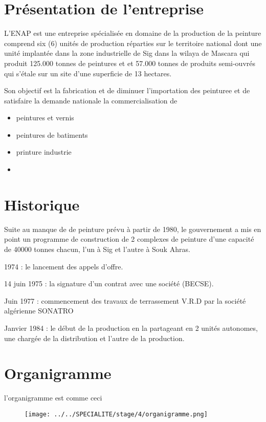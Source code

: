 \documentclass[20pt,a4paper]{report}
\begin{document}
		\begin{large}
		\section{Présentation de l’entreprise}

L’ENAP est une entreprise spécialisée en domaine de la production de la peinture comprend six (6) unités de production réparties sur le territoire national dont une unité implantée dans la zone industrielle de Sig dans la wilaya de Mascara qui produit 125.000 tonnes de peintures et et  57.000 tonnes de produits semi-ouvrés qui s’étale sur un site d’une superficie de  13 hectares.

Son objectif est la fabrication et  de diminuer l’importation des peinturee et de satisfaire la demande nationale la commercialisation de 
		\begin{itemize}
		\item peintures et vernis
		\item peintures de batiments
		\item printure industrie
		\item
		\end{itemize}




		\section{Historique}

Suite au manque de   de peinture prévu à partir de 1980, le gouvernement a mis en point un programme de construction de 2 complexes de peinture d’une capacité de 40000 tonnes chacun, l’un à Sig et l’autre à Souk Ahras.

1974 : le lancement des appels d’offre.

14 juin 1975 : la signature d’un contrat avec une société (BECSE).

Juin 1977 : commencement des travaux de terrassement V.R.D par la société algérienne SONATRO 

Janvier 1984 : le début de la production en la partageant en 2 unités autonomes, une chargée de la distribution et l’autre de la production.
		\section{Organigramme} 
 l'organigramme est comme ceci
		\end{large}
 			
 			\begin{figure}[h]
 			\centering
 			\texttt{[image: ../../SPECIALITE/stage/4/organigramme.png]}
 			\end{figure}
 			
\end{document}

